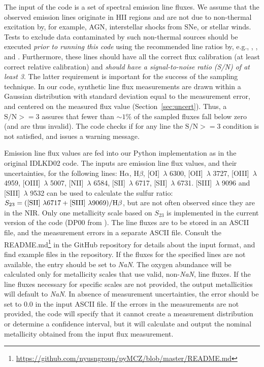 \documentclass{emulateapj}
\newcommand{\ha}{\ensuremath{\mathrm{H}\alpha}}
\newcommand{\hb}{\ensuremath{\mathrm{H}\beta}}
\begin{document}
The input of the code is a set of spectral emission line fluxes. We assume that the observed emission lines 
originate in HII regions and are not due to non-thermal excitation by, for example, AGN, interstellar shocks from SNe, or stellar winds.  Tests to exclude data contaminated by such non-thermal sources should be executed \emph{prior to running this code} using the recommended line ratios by, e.g., \citet{baldwin81}, \citet{kauffmann03}, and \citet{kewley06_sdss}. Furthermore, these lines should have all the correct flux calibration (at least correct relative calibration) and \emph{should have a signal-to-noise ratio (S/N) of at least 3}. The latter requirement is important for the success of the sampling technique. In our code, synthetic line flux measurements are drawn within a Gaussian distribution with standard deviation equal to the measurement error, and centered on the measured flux value (Section~\ref{sec:uncert}). Thus, a $\mathrm{S/N} >= 3$ assures that fewer than $\sim1\%$ of the sampled fluxes fall below zero (and are thus invalid).
The code checks if for any line the $\mathrm{S/N} >= 3$ condition is not satisfied, and issues a warning message.

Emission line flux values are fed into our Python implementation as in the original IDLKD02 code. The inputs are emission line flux values, and their uncertainties, for the following lines: \ha, \hb, [OI]~$\lambda$ 6300, [OII]~$\lambda$ 3727, [OIII]~$\lambda$ 4959, [OIII]~$\lambda$ 5007, [NII]~$\lambda$ 6584, [SII]~$\lambda$ 6717, [SII]~$\lambda$ 6731.  [SIII]~$\lambda$ 9096 and [SIII]~$\lambda$ 9532 can be used to calculate the sulfur ratio: $ S_{23}=  ( \mathrm{[SII]}~\lambda6717+\mathrm{[SIII]}~\lambda9069) / {\rm H}\beta $, but are not often observed since they are in the NIR. Only one metallicity scale based on $S_{23}$ is implemented in the current version of the code (DP00 from \citealt{diaz00}). The line fluxes are to be stored in an ASCII file, and the measurement errors in a separate ASCII file. Consult the README.md\footnote{\url{https://github.com/nyusngroup/pyMCZ/blob/master/README.md}} in the GitHub repository for details about the input format, and find example files in the repository. 
 If the fluxes for the specified lines are not available, the entry should be set to \emph{NaN}. The oxygen abundance will be calculated only for metallicity scales that use valid, non-\emph{NaN}, line fluxes. 
If the line fluxes necessary for specific scales are not provided, the output metallicities will default to \emph{NaN}. In absence of measurement uncertainties, the error should be set to 0.0 in the input ASCII file. If the errors in the measurements are not provided, the code will specify that it cannot create a measurement distribution or determine a confidence interval, but it will calculate and output the nominal metallicity obtained from the input flux measurement.
\end{document}
